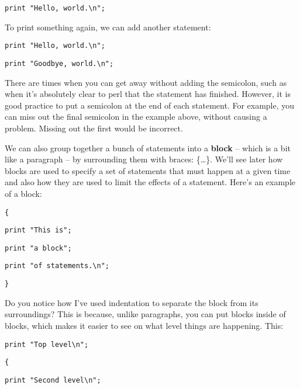 \documentclass[a4paper,12pt,twoside]{book}
\begin{document}
\noindent 

\noindent \texttt{print "Hello, world.\textbackslash n";}

\noindent 

\noindent To print something again, we can add another statement:

\noindent 

\noindent 

\noindent \texttt{print "Hello, world.\textbackslash n";}

\noindent \texttt{print "Goodbye, world.\textbackslash n";}

\noindent 

\noindent There are times when you can get away without adding the semicolon, 
such as when it's absolutely clear to perl that the statement has finished. 
However, it is good practice to put a semicolon at the end of each statement. 
For example, you can miss out the final semicolon in the example above, 
without causing a problem. Missing out the first would be incorrect.\medskip

\noindent 

\noindent We can also group together a bunch of statements into a \textbf{block }-- which is a bit like a paragraph -- by surrounding them with braces: \{\dots \}. We'll see later how blocks are used to specify a set of statements that must happen at a given time and also how they are used to limit the effects of a statement. Here's an example of a block:

\noindent 

\noindent \texttt{\{}

\noindent \texttt{print "This is";}

\noindent \texttt{print "a block";}

\noindent \texttt{print "of statements.\textbackslash n";}

\noindent \texttt{\}}

\noindent 

\noindent Do you notice how I've used indentation to separate the block from its surroundings? This is because, unlike paragraphs, you can put blocks inside of blocks, which makes it easier to see on what level things are happening. This:

\noindent 

\noindent \texttt{print "Top level\textbackslash n";}

\noindent \texttt{\{}

\noindent \texttt{print "Second level\textbackslash n";}
\end{document}
